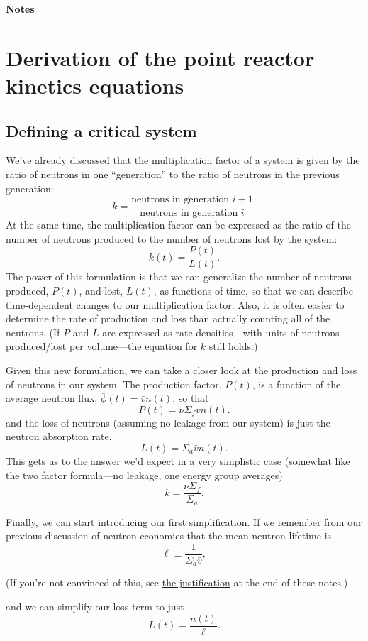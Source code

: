 \documentclass{report}
\begin{document}
\thispagestyle{FirstPage}
\begin{center}
\textbf{\large Notes}
\end{center}




\section*{Derivation of the point reactor kinetics equations} 

\subsection*{Defining a critical system}
We've already discussed that the multiplication factor of a system is given by the ratio of neutrons in one ``generation'' to the ratio of neutrons in the previous generation:
$$ k = \frac{\text{neutrons in generation }i + 1}{\text{neutrons in generation }i}.$$
At the same time, the multiplication factor can be expressed as the ratio of the number of neutrons produced to the number of neutrons lost by the system:
$$ k(t) = \frac{P(t)}{L(t)}.$$
The power of this formulation is that we can generalize the number of neutrons produced, $P(t)$, and lost, $L(t)$, as functions of time, so that we can describe time-dependent changes to our multiplication factor. Also, it is often easier to determine the rate of production and loss than actually counting all of the neutrons. (If $P$ and $L$ are expressed as rate densities---with units of neutrons produced/lost per volume---the equation for $k$ still holds.)

Given this new formulation, we can take a closer look at the production and loss of neutrons in our system. The production factor, $P(t)$, is a function of the average neutron flux, $\bar{\phi}(t) = \bar{v}n(t)$, so that 
$$ P(t) = \nu \Sigma_f \bar{v} n(t) .$$
and the loss of neutrons (assuming no leakage from our system) is just the neutron absorption rate, 
$$L(t) = \Sigma_a \bar{v}n(t) .$$
This gets us to the answer we'd expect in a very simplistic case (somewhat like the two factor formula---no leakage, one energy group averages)
$$ k = \frac{\nu \Sigma_f}{\Sigma_a} .$$

Finally, we can start introducing our first simplification. If we remember from our previous discussion of neutron economies that the mean neutron lifetime is 
$$ \ell \equiv \frac{1}{\Sigma_a \bar{v}}, $$
\begin{center}(If you're not convinced of this, see \hyperref[meanlifetime]{the justification} at the end of these notes.)\end{center}
and we can simplify our loss term to just 
$$L(t) = \frac{n(t)}{\ell} .$$
\end{document}
